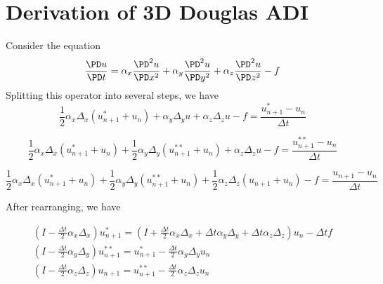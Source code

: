 \documentclass[11pt]{article}
\begin{document}
\doublespacing
\MOONSTITLE
\maketitle

\section{Derivation of 3D Douglas ADI}
Consider the equation
\begin{equation}
	\frac{\PD u}{\PD t}
	=
	\alpha_x \frac{\PD^2 u}{\PD x^2} +
	\alpha_y \frac{\PD^2 u}{\PD y^2} +
	\alpha_z \frac{\PD^2 u}{\PD z^2}
	-
	f
\end{equation}
Splitting this operator into several steps, we have
\begin{equation}
	\frac{1}{2} \alpha_x \Delta_x (u_{n+1}^{*} + u_{n}) +
	\alpha_y \Delta_y u +
	\alpha_z \Delta_z u	-
	f =
	\frac{u_{n+1}^{*} - u_{n}}{\Delta t}
\end{equation}

\begin{equation}
	\frac{1}{2} \alpha_x \Delta_x (u_{n+1}^{*} + u_{n}) +
	\frac{1}{2} \alpha_y \Delta_y (u_{n+1}^{**} + u_{n}) +
	\alpha_z \Delta_z u	-
	f =
	\frac{u_{n+1}^{**} - u_{n}}{\Delta t}
\end{equation}

\begin{equation}
	\frac{1}{2} \alpha_x \Delta_x (u_{n+1}^{*} + u_{n}) +
	\frac{1}{2} \alpha_y \Delta_y (u_{n+1}^{**} + u_{n}) +
	\frac{1}{2} \alpha_z \Delta_z (u_{n+1} + u_{n}) -
	f =
	\frac{u_{n+1} - u_{n}}{\Delta t}
\end{equation}

After rearranging, we have

\begin{equation}\boxed{\begin{aligned}
	\left(
	I - \frac{\Delta t}{2} \alpha_x \Delta_x
	\right)
	u_{n+1}^{*}
	=
	\left(
	I + \frac{\Delta t}{2} \alpha_x \Delta_x +
	\Delta t \alpha_y \Delta_y +
	\Delta t \alpha_z \Delta_z
	\right)
	u_n - \Delta t f \\
	\left(
	I - \frac{\Delta t}{2} \alpha_y \Delta_y
	\right)
	u_{n+1}^{**}
	=
	u_{n+1}^{*}
	- \frac{\Delta t}{2} \alpha_y \Delta_y u_n \\
	\left(
	I - \frac{\Delta t}{2} \alpha_z \Delta_z
	\right)
	u_{n+1}
	=
	u_{n+1}^{**}
	- \frac{\Delta t}{2} \alpha_z \Delta_z u_n
\end{aligned}}\end{equation}
\end{document}
